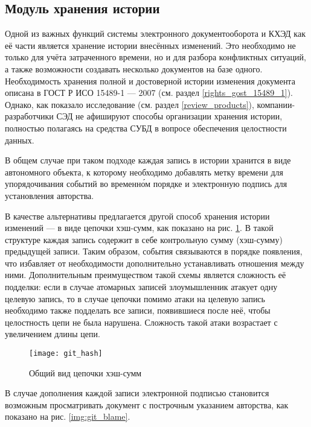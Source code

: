\subsection{Модуль хранения истории} \label{research_history}

Одной из важных функций системы электронного документооборота и КХЭД как её части является хранение истории внесённых изменений. Это необходимо не только для учёта затраченного времени, но и для разбора конфликтных ситуаций, а также возможности создавать несколько документов на базе одного. Необходимость хранения полной и достоверной истории изменения документа описана в ГОСТ Р ИСО 15489-1 --- 2007 (см. раздел \ref{rights_gost_15489_1}). Однако, как показало исследование (см. раздел \ref{review_products}), компании-разработчики СЭД не афишируют способы организации хранения истории, полностью полагаясь на средства СУБД в вопросе обеспечения целостности данных.

\vspace{\baselineskip}
В общем случае при таком подходе каждая запись в истории хранится в виде автономного объекта, к которому необходимо добавлять метку времени для упорядочивания событий во временн\'{о}м порядке и электронную подпись для установления авторства.

\vspace{\baselineskip}
В качестве альтернативы предлагается другой способ хранения истории изменений --- в виде цепочки хэш-сумм, как показано на рис. \ref{img:git_hash}. В такой структуре каждая запись содержит в себе контрольную сумму (хэш-сумму) предыдущей записи. Таким образом, события связываются в порядке появления, что избавляет от необходимости дополнительно устанавливать отношения между ними. Дополнительным преимуществом такой схемы является сложность её подделки: если в случае атомарных записей злоумышленник атакует одну целевую запись, то в случае цепочки помимо атаки на целевую запись необходимо также подделать все записи, появившиеся после неё, чтобы целостность цепи не была нарушена. Сложность такой атаки возрастает с увеличением длины цепи.
\begin{figure}[h!]
  \centering
  \texttt{[image: git\_hash]}
  \caption{Общий вид цепочки хэш-сумм}
  \label{img:git_hash}
\end{figure}

\vspace{\baselineskip}
В случае дополнения каждой записи электронной подписью становится возможным просматривать документ с построчным указанием авторства, как показано на рис. \ref{img:git_blame}.

